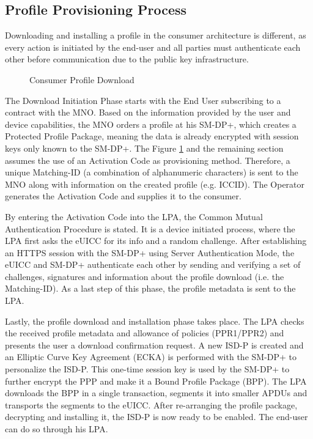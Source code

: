 \subsection{Profile Provisioning Process}
Downloading and installing a profile in the consumer architecture is different, as every action is initiated by the end-user and all parties must authenticate each other before communication due to the public key infrastructure.

\begin{figure}[ht]
    \centering
    \fontsize{7.7}{9.3}\selectfont
    
    \caption{Consumer Profile Download}
    \label{fig:consumer_download}
\end{figure}

The Download Initiation Phase starts with the End User subscribing to a contract with the MNO. Based on the information provided by the user and device capabilities, the MNO orders a profile at his SM-DP+, which creates a Protected Profile Package, meaning the data is already encrypted with session keys only known to the SM-DP+. The Figure \ref{fig:consumer_download} and the remaining section assumes the use of an Activation Code as provisioning method. Therefore, a unique Matching-ID (a combination of alphanumeric characters) is sent to the MNO along with information on the created profile (e.g. ICCID). The Operator generates the Activation Code and supplies it to the consumer.

By entering the Activation Code into the LPA, the Common Mutual Authentication Procedure is stated. It is a device initiated process, where the LPA first asks the eUICC for its info and a random challenge. After establishing an HTTPS session with the SM-DP+ using Server Authentication Mode, the eUICC and SM-DP+ authenticate each other by sending and verifying a set of challenges, signatures and information about the profile download (i.e. the Matching-ID). As a last step of this phase, the profile metadata is sent to the LPA.

Lastly, the profile download and installation phase takes place. The LPA checks the received profile metadata and allowance of policies (PPR1/PPR2) and presents the user a download confirmation request. A new ISD-P is created and an Elliptic Curve Key Agreement (ECKA) is performed with the SM-DP+ to personalize the ISD-P. This one-time session key is used by the SM-DP+ to further encrypt the PPP and make it a Bound Profile Package (BPP). The LPA downloads the BPP in a single transaction, segments it into smaller APDUs and transports the segments to the eUICC. After re-arranging the profile package, decrypting and installing it, the ISD-P is now ready to be enabled. The end-user can do so through his LPA.